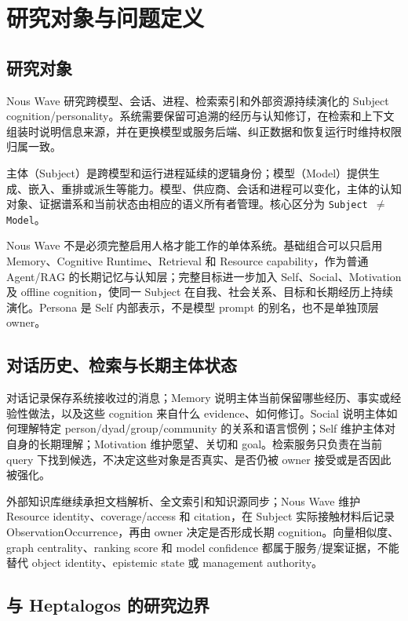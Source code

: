 \chapter{研究对象与问题定义}

\section{研究对象}

Nous Wave 研究跨模型、会话、进程、检索索引和外部资源持续演化的 Subject cognition/personality。系统需要保留可追溯的经历与认知修订，在检索和上下文组装时说明信息来源，并在更换模型或服务后端、纠正数据和恢复运行时维持权限归属一致。\cite{nous-research-package}

主体（Subject）是跨模型和运行进程延续的逻辑身份；模型（Model）提供生成、嵌入、重排或派生等能力。模型、供应商、会话和进程可以变化，主体的认知对象、证据谱系和当前状态由相应的语义所有者管理。核心区分为 \texttt{Subject $\neq$ Model}。

Nous Wave 不是必须完整启用人格才能工作的单体系统。基础组合可以只启用 Memory、Cognitive Runtime、Retrieval 和 Resource capability，作为普通 Agent/RAG 的长期记忆与认知层；完整目标进一步加入 Self、Social、Motivation 及 offline cognition，使同一 Subject 在自我、社会关系、目标和长期经历上持续演化。Persona 是 Self 内部表示，不是模型 prompt 的别名，也不是单独顶层 owner。

\section{对话历史、检索与长期主体状态}

对话记录保存系统接收过的消息；Memory 说明主体当前保留哪些经历、事实或经验性做法，以及这些 cognition 来自什么 evidence、如何修订。Social 说明主体如何理解特定 person/dyad/group/community 的关系和语言惯例；Self 维护主体对自身的长期理解；Motivation 维护愿望、关切和 goal。检索服务只负责在当前 query 下找到候选，不决定这些对象是否真实、是否仍被 owner 接受或是否因此被强化。

外部知识库继续承担文档解析、全文索引和知识源同步；Nous Wave 维护 Resource identity、coverage/access 和 citation，在 Subject 实际接触材料后记录 ObservationOccurrence，再由 owner 决定是否形成长期 cognition。向量相似度、graph centrality、ranking score 和 model confidence 都属于服务/提案证据，不能替代 object identity、epistemic state 或 management authority。\cite{mem0-commit,graphiti-commit,nous-research-package}

\section{与 Heptalogos 的研究边界}


